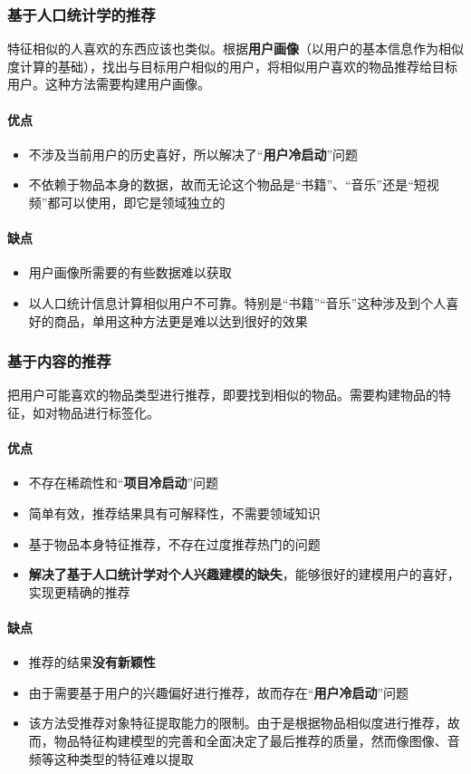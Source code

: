 \subsubsection{基于人口统计学的推荐}
特征相似的人喜欢的东西应该也类似。根据\textbf{用户画像}（以用户的基本信息作为相似度计算的基础），找出与目标用户相似的用户，将相似用户喜欢的物品推荐给目标用户。这种方法需要构建用户画像。
\paragraph{优点}
\begin{itemize}
	\item 不涉及当前用户的历史喜好，所以解决了“\textbf{用户冷启动}”问题
	\item 不依赖于物品本身的数据，故而无论这个物品是“书籍”、“音乐”还是“短视频”都可以使用，即它是领域独立的
\end{itemize}

\paragraph{缺点}
\begin{itemize}
	\item 用户画像所需要的有些数据难以获取
	\item 以人口统计信息计算相似用户不可靠。特别是“书籍”“音乐”这种涉及到个人喜好的商品，单用这种方法更是难以达到很好的效果
\end{itemize}

\subsubsection{基于内容的推荐}
把用户可能喜欢的物品类型进行推荐，即要找到相似的物品。需要构建物品的特征，如对物品进行标签化。
\paragraph{优点}
\begin{itemize}
	\item 不存在稀疏性和“\textbf{项目冷启动}”问题
	\item 简单有效，推荐结果具有可解释性，不需要领域知识
	\item 基于物品本身特征推荐，不存在过度推荐热门的问题
	\item \textbf{解决了基于人口统计学对个人兴趣建模的缺失}，能够很好的建模用户的喜好，实现更精确的推荐
\end{itemize}

\paragraph{缺点}
\begin{itemize}
	\item 推荐的结果\textbf{没有新颖性}
	\item 由于需要基于用户的兴趣偏好进行推荐，故而存在“\textbf{用户冷启动}”问题
	\item 该方法受推荐对象特征提取能力的限制。由于是根据物品相似度进行推荐，故而，物品特征构建模型的完善和全面决定了最后推荐的质量，然而像图像、音频等这种类型的特征难以提取
\end{itemize}

